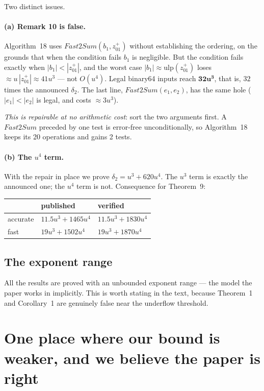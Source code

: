 \documentclass[11pt,a4paper]{article}
\newcommand{\ulp}{\mathrm{ulp}}
\newcommand{\alg}[1]{\mathit{#1}}
\begin{document}
Two distinct issues.

\paragraph{(a) Remark 10 is false.}
Algorithm~18 uses $\alg{Fast2Sum}(b_1, z_{01}^{+})$ without establishing the
ordering, on the grounds that when the condition fails $b_1$ is negligible.
But the condition fails exactly when $|b_1| < |z_{01}^{+}|$, and the worst case
$|b_1| \approx \ulp(z_{01}^{+})$ loses $\approx u\,|z_{01}^{+}| \approx 41u^3$
--- not $O(u^4)$. Legal binary64 inputs reach $\mathbf{32u^3}$, that is,
$32$ times the announced $\delta_2$. The last line,
$\alg{Fast2Sum}(e_1, e_2)$, has the same hole ($|e_1| < |e_2|$ is legal, and
costs $\approx 3u^3$).

\emph{This is repairable at no arithmetic cost}: sort the two arguments first.
A $\alg{Fast2Sum}$ preceded by one test is error-free unconditionally, so
Algorithm~18 keeps its 20 operations and gains 2 tests.

\paragraph{(b) The $u^4$ term.}
With the repair in place we prove $\delta_2 = u^3 + 620u^4$. The $u^3$ term is
exactly the announced one; the $u^4$ term is not. Consequence for Theorem~9:

\begin{center}
\begin{tabular}{@{}lll@{}}
\toprule
                & published            & verified \\
\midrule
accurate        & $11.5u^3 + 1465u^4$  & $11.5u^3 + 1830u^4$ \\
fast            & $19u^3 + 1502u^4$    & $19u^3 + 1870u^4$ \\
\bottomrule
\end{tabular}
\end{center}

\subsection{The exponent range}

All the results are proved with an unbounded exponent range --- the model the
paper works in implicitly. This is worth stating in the text, because
Theorem~1 and Corollary~1 are genuinely false near the underflow threshold.

\section{One place where our bound is weaker, and we believe the paper is
right}\label{sec:delta3}
\end{document}
